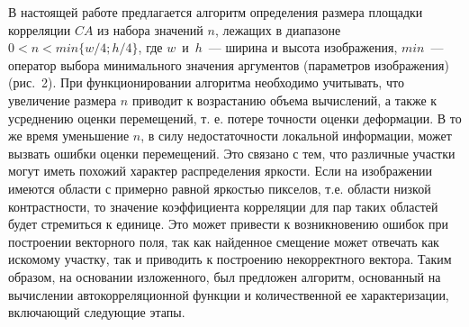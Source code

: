 \documentclass[a4paper]{jctart10}
\begin{document}
В настоящей работе предлагается алгоритм определения размера площадки корреляции $CA$ из набора значений $n$, лежащих в диапазоне $0 < n < min\{w/4;h/4\}$, где $w$~и~$h$~--- ширина и высота изображения, $min$~--- оператор выбора минимального значения аргументов (параметров изображения) (рис.~2). При функционировании алгоритма необходимо учитывать, что увеличение размера $n$ приводит к возрастанию объема вычислений, а также к усреднению оценки перемещений, т. е. потере точности оценки деформации. В то же время уменьшение $n$, в силу недостаточности локальной информации, может вызвать ошибки оценки перемещений. Это связано с тем, что различные участки могут иметь похожий характер распределения яркости. Если на изображении имеются области с примерно равной яркостью пикселов, т.е. области низкой контрастности, то значение коэффициента корреляции для пар таких областей будет стремиться к единице. Это может привести к возникновению ошибок при построении векторного поля, так как найденное смещение может отвечать как искомому участку, так и приводить к построению некорректного вектора. Таким образом, на основании изложенного, был предложен алгоритм, основанный на вычислении автокорреляционной функции и количественной ее характеризации, включающий следующие этапы.
\end{document}
